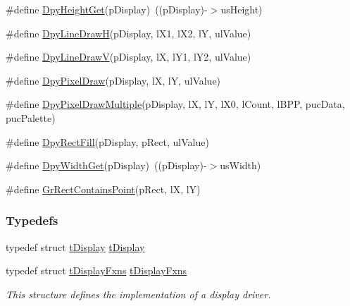 \begin{DoxyCompactItemize}
\#define \hyperlink{group__primitives__api_ga541c63fcce8846a3f5cdb2d125f437d5}{Dpy\+Height\+Get}(p\+Display)~((p\+Display)-\/$>$us\+Height)
\item 
\#define \hyperlink{group__primitives__api_ga1d43358f05529bb6d9aa4d0daccba49d}{Dpy\+Line\+Draw\+H}(p\+Display,  l\+X1,  l\+X2,  l\+Y,  ul\+Value)
\item 
\#define \hyperlink{group__primitives__api_ga94c839d4e7f87e4881a4bb099425dca4}{Dpy\+Line\+Draw\+V}(p\+Display,  l\+X,  l\+Y1,  l\+Y2,  ul\+Value)
\item 
\#define \hyperlink{group__primitives__api_ga02c56228affc2d89eee30054cce3c59c}{Dpy\+Pixel\+Draw}(p\+Display,  l\+X,  l\+Y,  ul\+Value)
\item 
\#define \hyperlink{group__primitives__api_ga1838b1dd4ef2a8e109e10e8de19ee78f}{Dpy\+Pixel\+Draw\+Multiple}(p\+Display,  l\+X,  l\+Y,  l\+X0,  l\+Count,  l\+B\+P\+P,  puc\+Data, puc\+Palette)
\item 
\#define \hyperlink{group__primitives__api_ga3b26d580d4523d639c77b17b8d52d22b}{Dpy\+Rect\+Fill}(p\+Display,  p\+Rect,  ul\+Value)
\item 
\#define \hyperlink{group__primitives__api_ga0a967ef53683123dc57ff3b6ed096289}{Dpy\+Width\+Get}(p\+Display)~((p\+Display)-\/$>$us\+Width)
\item 
\#define \hyperlink{group__primitives__api_gad87e27477b181580adc6dcf5d34a3308}{Gr\+Rect\+Contains\+Point}(p\+Rect,  l\+X,  l\+Y)
\end{DoxyCompactItemize}
\subsubsection*{Typedefs}
\begin{DoxyCompactItemize}
\item 
typedef struct \hyperlink{structt_display}{t\+Display} \hyperlink{group__primitives__api_gab21d3a88cc08e5621451ebb6a7a2f18a}{t\+Display}
\item 
typedef struct \hyperlink{structt_display_fxns}{t\+Display\+Fxns} \hyperlink{group__primitives__api_ga58add1ad881d3b29fdbb7ff55421c0a1}{t\+Display\+Fxns}
\begin{DoxyCompactList}\small\item\em This structure defines the implementation of a display driver. \end{DoxyCompactList}\end{DoxyCompactItemize}
